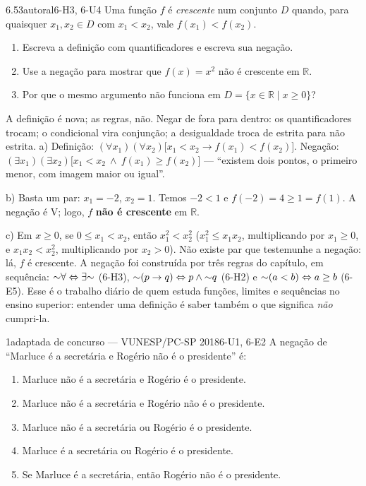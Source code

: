 \begin{exemplo}{6.5}{3}{autoral}{6-H3, 6-U4}\label{ex:6.5}
Uma função $f$ é \emph{crescente} num conjunto $D$ quando, para quaisquer $x_1,x_2\in D$ com $x_1<x_2$, vale $f(x_1)<f(x_2)$.
\begin{enumerate}[label=\alph*)]
  \item Escreva a definição com quantificadores e escreva sua negação.
  \item Use a negação para mostrar que $f(x)=x^2$ não é crescente em $\mathbb{R}$.
  \item Por que o mesmo argumento não funciona em $D=\{x\in\mathbb{R}\mid x\ge0\}$?
\end{enumerate}
\plano A definição é nova; as regras, não. Negar de fora para dentro: os quantificadores trocam; o condicional vira conjunção; a desigualdade troca de estrita para não estrita.
\resolucao
a) Definição: $(\forall x_1)(\forall x_2)\big[x_1<x_2\rightarrow f(x_1)<f(x_2)\big]$.
Negação: $(\exists x_1)(\exists x_2)\big[x_1<x_2\ \wedge\ f(x_1)\ge f(x_2)\big]$ — \enquote{existem dois pontos, o primeiro menor, com imagem maior ou igual}.
\par b) Basta um par: $x_1=-2$, $x_2=1$. Temos $-2<1$ e $f(-2)=4\ge1=f(1)$. A negação é V; logo, $f$ \textbf{não é crescente} em $\mathbb{R}$.
\par c) Em $x\ge0$, se $0\le x_1<x_2$, então $x_1^2<x_2^2$ ($x_1^2\le x_1x_2$, multiplicando por $x_1\ge0$, e $x_1x_2<x_2^2$, multiplicando por $x_2>0$). Não existe par que testemunhe a negação: lá, $f$ é crescente.
\comentario A negação foi construída por três regras do capítulo, em sequência: ${{\sim}}\forall\Leftrightarrow\exists{{\sim}}$ (6-H3), ${{\sim}}(p\rightarrow q)\Leftrightarrow p\wedge{{\sim}}q$ (6-H2) e ${{\sim}}(a<b)\Leftrightarrow a\ge b$ (6-E5). Esse é o trabalho diário de quem estuda funções, limites e sequências no ensino superior: entender uma definição é saber também o que significa \emph{não} cumpri-la.
\end{exemplo}

\Questoes

\begin{questao}{1}{adaptada de concurso — VUNESP/PC-SP 2018}{6-U1, 6-E2}\label{u6:q1}
A negação de \enquote{Marluce é a secretária e Rogério não é o presidente} é:
\begin{enumerate}[label=(\alph*)]
  \item Marluce não é a secretária e Rogério é o presidente.
  \item Marluce não é a secretária e Rogério não é o presidente.
  \item Marluce não é a secretária ou Rogério é o presidente.
  \item Marluce é a secretária ou Rogério é o presidente.
  \item Se Marluce é a secretária, então Rogério não é o presidente.
\end{enumerate}
\end{questao}

